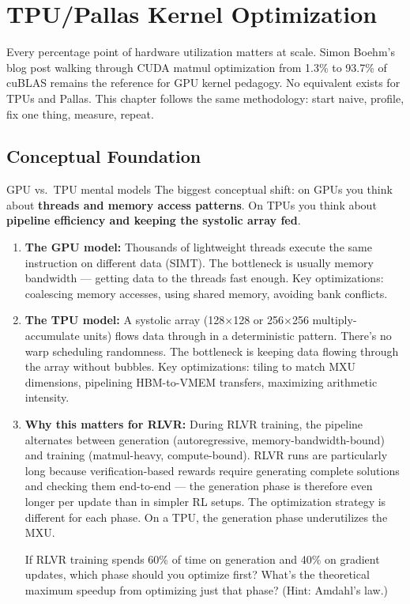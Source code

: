 \section{TPU/Pallas Kernel Optimization}

\smallskip

\begin{whythis}
Every percentage point of hardware utilization matters at scale. Simon Boehm's blog post walking through CUDA matmul optimization from 1.3\% to 93.7\% of cuBLAS remains the reference for GPU kernel pedagogy. No equivalent exists for TPUs and Pallas. This chapter follows the same methodology: start naive, profile, fix one thing, measure, repeat.
\end{whythis}

\subsection{Conceptual Foundation}

\begin{thinkfirst}{GPU vs.\ TPU mental models}
The biggest conceptual shift: on GPUs you think about \textbf{threads and memory access patterns}. On TPUs you think about \textbf{pipeline efficiency and keeping the systolic array fed}.

\begin{enumerate}
  \item \textbf{The GPU model:} Thousands of lightweight threads execute the same instruction on different data (SIMT). The bottleneck is usually memory bandwidth --- getting data to the threads fast enough. Key optimizations: coalescing memory accesses, using shared memory, avoiding bank conflicts.

  \item \textbf{The TPU model:} A systolic array (128$\times$128 or 256$\times$256 multiply-accumulate units) flows data through in a deterministic pattern. There's no warp scheduling randomness. The bottleneck is keeping data flowing through the array without bubbles. Key optimizations: tiling to match MXU dimensions, pipelining HBM-to-VMEM transfers, maximizing arithmetic intensity.

  \item \textbf{Why this matters for RLVR:} During RLVR training, the pipeline alternates between generation (autoregressive, memory-bandwidth-bound) and training (matmul-heavy, compute-bound). RLVR runs are particularly long because verification-based rewards require generating complete solutions and checking them end-to-end --- the generation phase is therefore even longer per update than in simpler RL setups. The optimization strategy is different for each phase. On a TPU, the generation phase underutilizes the MXU.

  If RLVR training spends 60\% of time on generation and 40\% on gradient updates, which phase should you optimize first? What's the theoretical maximum speedup from optimizing just that phase? (Hint: Amdahl's law.)
\end{enumerate}
\end{thinkfirst}

